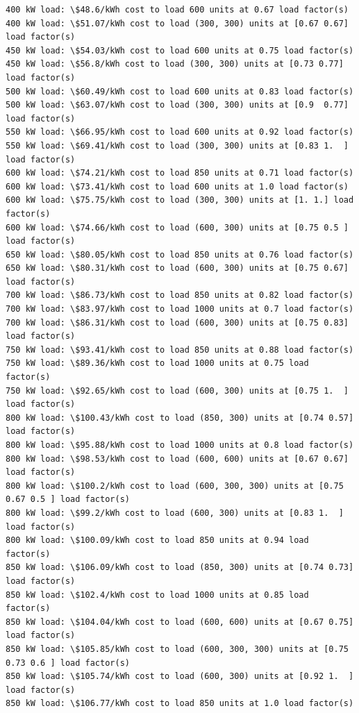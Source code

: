 \documentclass[11pt]{article}
\begin{document}
    \begin{Verbatim}[commandchars=\\\{\}]
400 kW load: \$48.6/kWh cost to load 600 units at 0.67 load factor(s)
400 kW load: \$51.07/kWh cost to load (300, 300) units at [0.67 0.67] load factor(s)
450 kW load: \$54.03/kWh cost to load 600 units at 0.75 load factor(s)
450 kW load: \$56.8/kWh cost to load (300, 300) units at [0.73 0.77] load factor(s)
500 kW load: \$60.49/kWh cost to load 600 units at 0.83 load factor(s)
500 kW load: \$63.07/kWh cost to load (300, 300) units at [0.9  0.77] load factor(s)
550 kW load: \$66.95/kWh cost to load 600 units at 0.92 load factor(s)
550 kW load: \$69.41/kWh cost to load (300, 300) units at [0.83 1.  ] load factor(s)
600 kW load: \$74.21/kWh cost to load 850 units at 0.71 load factor(s)
600 kW load: \$73.41/kWh cost to load 600 units at 1.0 load factor(s)
600 kW load: \$75.75/kWh cost to load (300, 300) units at [1. 1.] load factor(s)
600 kW load: \$74.66/kWh cost to load (600, 300) units at [0.75 0.5 ] load factor(s)
650 kW load: \$80.05/kWh cost to load 850 units at 0.76 load factor(s)
650 kW load: \$80.31/kWh cost to load (600, 300) units at [0.75 0.67] load factor(s)
700 kW load: \$86.73/kWh cost to load 850 units at 0.82 load factor(s)
700 kW load: \$83.97/kWh cost to load 1000 units at 0.7 load factor(s)
700 kW load: \$86.31/kWh cost to load (600, 300) units at [0.75 0.83] load factor(s)
750 kW load: \$93.41/kWh cost to load 850 units at 0.88 load factor(s)
750 kW load: \$89.36/kWh cost to load 1000 units at 0.75 load factor(s)
750 kW load: \$92.65/kWh cost to load (600, 300) units at [0.75 1.  ] load factor(s)
800 kW load: \$100.43/kWh cost to load (850, 300) units at [0.74 0.57] load factor(s)
800 kW load: \$95.88/kWh cost to load 1000 units at 0.8 load factor(s)
800 kW load: \$98.53/kWh cost to load (600, 600) units at [0.67 0.67] load factor(s)
800 kW load: \$100.2/kWh cost to load (600, 300, 300) units at [0.75 0.67 0.5 ] load factor(s)
800 kW load: \$99.2/kWh cost to load (600, 300) units at [0.83 1.  ] load factor(s)
800 kW load: \$100.09/kWh cost to load 850 units at 0.94 load factor(s)
850 kW load: \$106.09/kWh cost to load (850, 300) units at [0.74 0.73] load factor(s)
850 kW load: \$102.4/kWh cost to load 1000 units at 0.85 load factor(s)
850 kW load: \$104.04/kWh cost to load (600, 600) units at [0.67 0.75] load factor(s)
850 kW load: \$105.85/kWh cost to load (600, 300, 300) units at [0.75 0.73 0.6 ] load factor(s)
850 kW load: \$105.74/kWh cost to load (600, 300) units at [0.92 1.  ] load factor(s)
850 kW load: \$106.77/kWh cost to load 850 units at 1.0 load factor(s)

\end{Verbatim}
\end{document}

